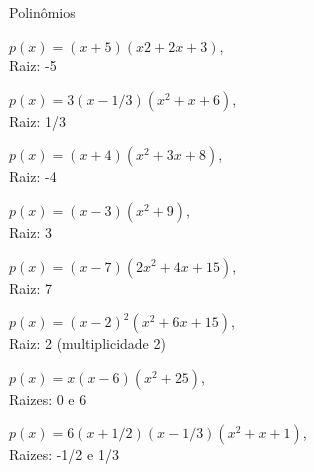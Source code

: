 \begin{exercicios}{Polinômios}
\begin{exercicio}
\begin{answers}
\begin{alphalist}
                \item $p(x) = (x + 5) (x 2 + 2x + 3)$,                \\[1mm] Raiz: -5
                \item $p(x) = 3 (x - 1/3)(x^2+x+6)$,                  \\[1mm] Raiz: 1/3
                \item $p(x) = (x + 4) (x^2 + 3x + 8)$,                \\[1mm] Raiz: -4
                \item $p(x) = (x - 3) (x^2 + 9)$,                     \\[1mm] Raiz: 3
                \item $p(x) = (x - 7) (2x^2 + 4x + 15)$,              \\[1mm] Raiz: 7
                \item $p(x) = (x - 2)^2 (x^2 + 6x + 15)$,             \\[1mm] Raiz: 2 (multiplicidade 2)
                \item $p(x) = x(x - 6) (x^2 + 25)$,                   \\[1mm] Raizes: 0 e 6
                \item $p(x) = 6 (x + 1/2 ) (x - 1/3 ) (x^2 + x + 1)$, \\[1mm] Raizes: -1/2 e 1/3                            
            \end{alphalist}
        \end{answers}
    \end{exercicio}
    
\end{exercicios}


